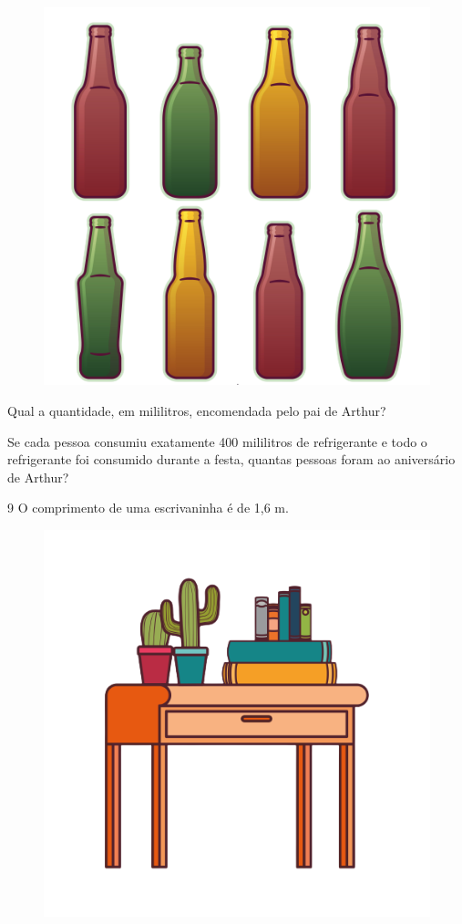 \begin{figure}[htpb!]
\centering
\includegraphics[width=.6\textwidth]{./media/image47a.png}
\end{figure}

\begin{escolha}
\item Qual a quantidade, em mililitros, encomendada pelo pai de Arthur?

\item Se cada pessoa consumiu exatamente 400 mililitros de refrigerante e
  todo o refrigerante foi consumido durante a festa, quantas pessoas
  foram ao aniversário de Arthur?
\end{escolha}

\num{9} O comprimento de uma escrivaninha é de 1,6 m. 

\begin{figure}[htpb!]
\centering
\includegraphics[width=.5\textwidth]{./media/image47b.png}
\end{figure}

